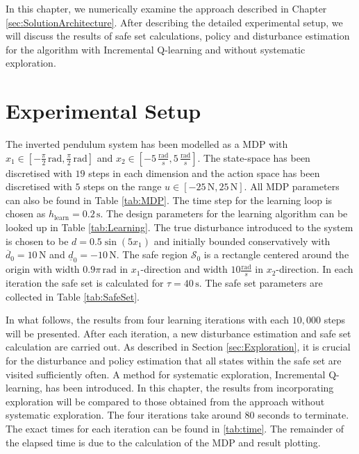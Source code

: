 \documentclass[../main.tex]{subfiles}
\begin{document}
\renewcommand{\arraystretch}{1.3}
In this chapter, we numerically examine the approach described in Chapter \ref{sec:SolutionArchitecture}. After describing the detailed experimental setup, we will discuss the results of safe set calculations, policy and disturbance estimation for the algorithm with Incremental Q-learning and without systematic exploration.
\section{Experimental Setup}

 The inverted pendulum system has been modelled as a MDP with $x_1\in [-\frac{\pi}{2} \, \text{rad}, \frac{\pi}{2} \,\text{rad}] $ and $x_2 \in [-5\, \frac{\text{rad}}{s},5 \,\frac{\text{rad}}{s}] $. The state-space has been discretised with $19$ steps in each dimension and the action space has been discretised with $5$ steps on the range $u \in [-25\,\text{N},25\,\text{N}] $. All MDP parameters can also be found in Table \ref{tab:MDP}. The time step for the learning loop is chosen as $h_\text{learn} = 0.2\,\text{s}$. The design parameters for the learning algorithm can be looked up in Table \ref{tab:Learning}. The true disturbance introduced to the system is chosen to be $d = 0.5\sin(5x_1)$ and initially bounded conservatively with $\overline{d}_0 = 10 \,\text{N}$ and $\underline{d}_0 = -10 \,\text{N}$. The safe region $\mathcal{S}_0$ is a rectangle centered around the origin with width $0.9\pi \, \text{rad}$ in $x_1$-direction and width $10\frac{\text{rad}}{s}$ in $x_2$-direction. In each iteration the safe set is calculated for $\tau = 40\,\text{s}$. The safe set parameters are collected in Table \ref{tab:SafeSet}.

In what follows, the results from four learning iterations with each $10,000$ steps will be presented. After each iteration, a new disturbance estimation and safe set calculation are carried out. As described in Section \ref{sec:Exploration}, it is crucial for the disturbance and policy estimation that all states within the safe set are visited sufficiently often. A method for systematic exploration, Incremental Q-learning, has been introduced. In this chapter, the results from incorporating exploration will be compared to those obtained from the approach without systematic exploration. The four iterations take around $80$ seconds to terminate. The exact times for each iteration can be found in \ref{tab:time}. The remainder of the elapsed time is due to the calculation of the MDP and result plotting.
\end{document}
